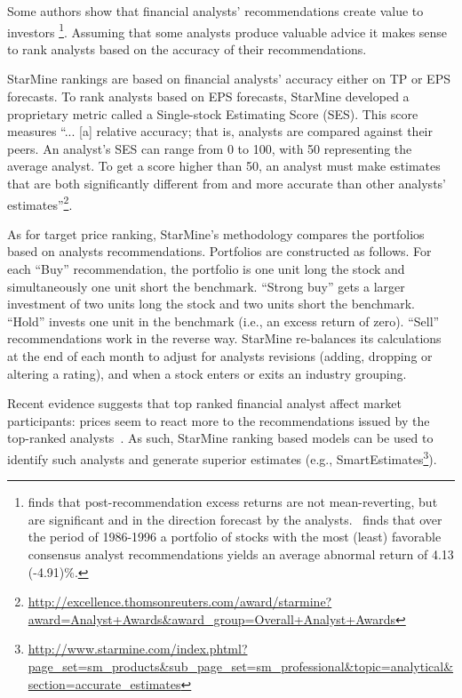 \documentclass[a4paper,twoside,12pt,openright,notitlepage]{report}\usepackage[]{graphicx}\usepackage[]{color}
\begin{document}
Some authors show that financial analysts' recommendations create value to investors \citep{womack1996,barber2001}\footnote{\cite{womack1996} finds that  post-recommendation excess returns are not mean-reverting, but are significant and in the direction forecast by the analysts.~\cite{barber2001} finds that over the period of 1986-1996 a portfolio of stocks with the most (least) favorable consensus analyst recommendations yields an average abnormal return of 4.13 (-4.91)\%.}. Assuming that some analysts produce valuable advice it makes sense to rank analysts based on the accuracy of their recommendations.

StarMine rankings are based on financial analysts' accuracy either on TP or EPS forecasts. To rank analysts based on EPS forecasts, StarMine developed a proprietary metric called a Single-stock Estimating Score (SES). This score measures ``... [a] relative accuracy; that is, analysts are compared against their peers. An analyst's SES can range from 0 to 100, with 50 representing the average analyst. To get a score higher than 50, an analyst must make estimates that are both significantly different from and more accurate than other analysts' estimates''\footnote{\url{http://excellence.thomsonreuters.com/award/starmine?award=Analyst+Awards&award_group=Overall+Analyst+Awards}}.


As for target price ranking, StarMine's methodology compares the portfolios based on analysts recommendations. Portfolios are constructed as follows. For each ``Buy'' recommendation, the portfolio is one unit long the stock and simultaneously one unit short the benchmark. ``Strong buy'' gets a larger investment of two units long the stock and two units short the benchmark. ``Hold'' invests one unit in the benchmark (i.e., an excess return of zero). ``Sell'' recommendations work in the reverse way. StarMine re-balances its calculations at the end of each month to adjust for analysts revisions (adding, dropping or altering a rating), and when a stock enters or exits an industry grouping.


Recent evidence suggests that top ranked financial analyst affect market participants: prices seem to react more to the recommendations issued by the top-ranked analysts~\citep{emery2009}. As such, StarMine ranking based models can be used to identify such analysts and generate superior estimates (e.g., SmartEstimates\footnote{\url{http://www.starmine.com/index.phtml?page_set=sm_products&sub_page_set=sm_professional&topic=analytical&section=accurate_estimates}}).
\end{document}
